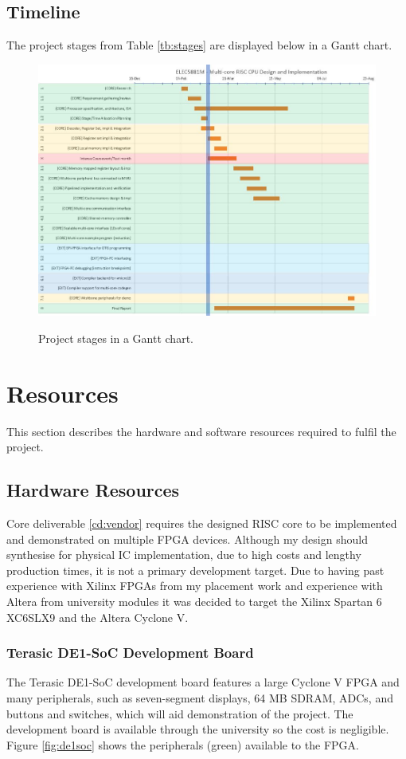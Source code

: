 \documentclass[11pt,a4paper]{report}
\begin{document}
{\subsection{Timeline}
The project stages from Table \ref{tb:stages} are displayed below in a Gantt chart.

\begin{figure}[h]
\centering
\includegraphics[width=13cm]{../img/week1_gantt}
\label{fig:arduino_record}
\caption{Project stages in a Gantt chart.}
\end{figure}


\section{Resources}
This section describes the hardware and software resources required to fulfil the project. 

\subsection{Hardware Resources}
Core deliverable \ref{cd:vendor} requires the designed RISC core to be implemented and demonstrated on multiple FPGA devices.  Although my design should synthesise for physical IC implementation, due to high costs and lengthy production times, it is not a primary development target. 
Due to having past experience with Xilinx FPGAs from my placement work and experience with Altera from university modules it was decided to target the Xilinx Spartan 6 XC6SLX9 and the Altera Cyclone V.

\subsubsection{Terasic DE1-SoC Development Board}
The Terasic DE1-SoC development board features a large Cyclone V FPGA and many peripherals, such as seven-segment displays, 64 MB SDRAM, ADCs, and buttons and switches, which will aid demonstration of the project. The development board is available through the university so the cost is negligible. Figure \ref{fig:de1soc} shows the peripherals (green) available to the FPGA.

}
\end{document}
